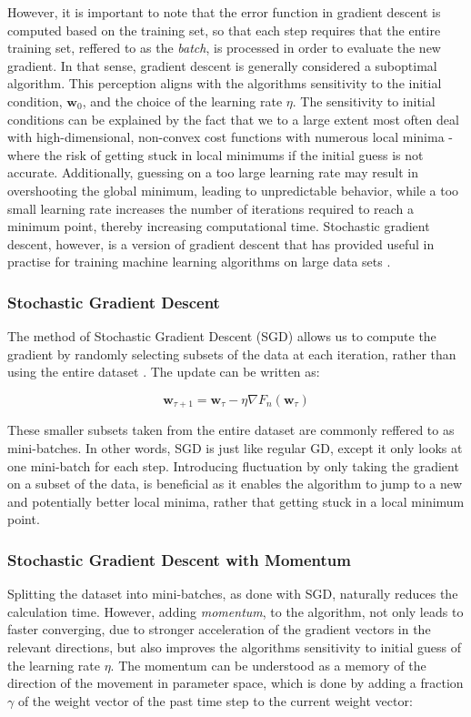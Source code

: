 \documentclass[a4paper, UKenglish, 11pt]{uiomaster}
\begin{document}
However, it is important to note that the error function in gradient descent is computed based on the training set, so that each step requires that the entire training set, reffered to as the \emph{batch}, is processed in order to evaluate the new gradient. In that sense, gradient descent is generally considered a suboptimal algorithm. This perception aligns with the algorithms sensitivity to the initial condition, $\textbf{w}_0$, and the choice of the learning rate $\eta$. The sensitivity to initial conditions can be explained by the fact that we to a large extent most often deal with high-dimensional, non-convex cost functions with numerous local minima - where the risk of getting stuck in local minimums if the initial guess is not accurate. Additionally, guessing on a too large learning rate may result in overshooting the global minimum, leading to unpredictable behavior, while a too small learning rate increases the number of iterations required to reach a minimum point, thereby increasing computational time. Stochastic gradient descent, however, is a version of gradient descent that has provided useful in practise for training machine learning algorithms on large data sets \cite{bishop2006pattern}.

\subsubsection{Stochastic Gradient Descent}
The method of Stochastic Gradient Descent (SGD) allows us to compute the gradient by randomly selecting subsets of the data at each iteration, rather than using the entire dataset \cite{bishop2006pattern}. The update can be written as:

\begin{equation}
\textbf{w}_{\tau+1} = \textbf{w}_{\tau} - \eta\nabla F_n(\textbf{w}_\tau)
\end{equation}

These smaller subsets taken from the entire dataset are commonly reffered to as mini-batches. In other words, SGD is just like regular GD, except it only looks at one mini-batch for each step. Introducing fluctuation by only taking the gradient on a subset of the data, is beneficial as it enables the algorithm to jump to a new and potentially better local minima, rather that getting stuck in a local minimum point.

\subsubsection{Stochastic Gradient Descent with Momentum}
Splitting the dataset into mini-batches, as done with SGD, naturally reduces the calculation time. However, adding \emph{momentum}, to the algorithm, not only leads to faster converging, due to stronger acceleration of the gradient vectors in the relevant directions, but also improves the algorithms sensitivity to initial guess of the learning rate $\eta$. The momentum can be understood as a memory of the direction of the movement in parameter space, which is done by adding a fraction $\gamma$ of the weight vector of the past time step to the current weight vector:
\end{document}
